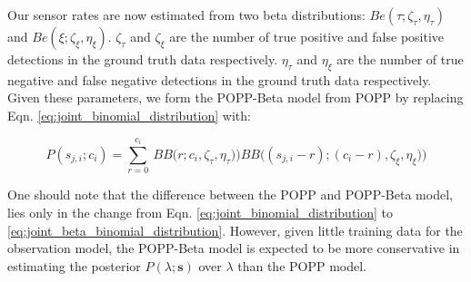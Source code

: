 Our sensor rates are now estimated from two beta distributions: $Be(\tau ; \zeta_{\tau}, \eta_{\tau})$ and $Be(\xi ; \zeta_{\xi}, \eta_{\xi})$.
% 
$\zeta_{\tau}$ and $\zeta_{\xi}$ are the number of true positive and false positive detections in the ground truth data respectively.
% 
$\eta_{\tau}$ and $\eta_{\xi}$ are the number of true negative and false  negative detections in the ground truth data respectively. 
% 
Given these parameters, we form the POPP-Beta model from POPP by replacing Eqn. \ref{eq:joint_binomial_distribution} with:  

\begin{equation}
	\label{eq:joint_beta_binomial_distribution}
    P(s_{j,i} ; c_i) \! = \! \! \! \displaystyle\sum_{r = 0}^{c_{i}} \! \! ~ BB\Big(r ; c_i, \zeta_{\tau}, \eta_{\tau}) \Big) BB\Big( (s_{j,i} - r) ; (c_i - r), \zeta_{\xi}, \eta_{\xi}) \Big)
\end{equation}



One should note that the difference between the POPP and POPP-Beta model, lies only in the change from Eqn. \ref{eq:joint_binomial_distribution} to \ref{eq:joint_beta_binomial_distribution}. However, given little training data for the observation model, the POPP-Beta model is expected to be more conservative in estimating the posterior $P(\lambda ; \mathbf{s})$ over $\lambda$ than the POPP model. 

